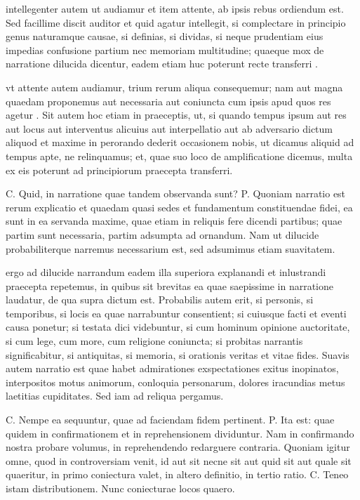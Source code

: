  intellegenter autem ut audiamur et item attente, ab ipsis rebus ordiendum est. Sed facillime discit auditor et quid agatur intellegit, si complectare in principio genus naturamque causae, si definias, si dividas, si neque prudentiam eius impedias confusione partium nec memoriam multitudine; quaeque mox de narratione dilucida dicentur, eadem etiam huc poterunt recte transferri .

 vt attente autem audiamur, trium rerum aliqua consequemur; nam aut magna quaedam proponemus aut necessaria aut coniuncta cum ipsis apud quos res agetur . Sit autem hoc etiam in praeceptis, ut, si quando tempus ipsum aut res aut locus aut interventus alicuius aut interpellatio aut ab adversario dictum aliquod et maxime in perorando dederit occasionem nobis, ut dicamus aliquid ad tempus apte, ne relinquamus; et, quae suo loco de amplificatione dicemus, multa ex eis poterunt ad principiorum praecepta transferri.

 C. Quid, in narratione quae tandem observanda sunt? P. Quoniam narratio est rerum explicatio et quaedam quasi sedes et fundamentum constituendae fidei, ea sunt in ea servanda maxime, quae etiam in reliquis fere dicendi partibus; quae partim sunt necessaria, partim adsumpta ad ornandum. Nam ut dilucide probabiliterque narremus necessarium est, sed adsumimus etiam suavitatem.

 ergo ad dilucide narrandum eadem illa superiora explanandi et inlustrandi praecepta repetemus, in quibus sit brevitas ea quae saepissime in narratione laudatur, de qua supra dictum est. Probabilis autem erit, si personis, si temporibus, si locis ea quae narrabuntur consentient; si cuiusque facti et eventi causa ponetur; si testata dici videbuntur, si cum hominum opinione auctoritate, si cum lege, cum more, cum religione coniuncta; si probitas narrantis significabitur, si antiquitas, si memoria, si orationis veritas et vitae fides. Suavis autem narratio est quae habet admirationes exspectationes exitus inopinatos, interpositos motus animorum, conloquia personarum, dolores iracundias metus laetitias cupiditates. Sed iam ad reliqua pergamus.

 C. Nempe ea sequuntur, quae ad faciendam fidem pertinent. P. Ita est: quae quidem in confirmationem et in reprehensionem dividuntur. Nam in confirmando nostra probare volumus, in reprehendendo redarguere contraria. Quoniam igitur omne, quod in controversiam venit, id aut sit necne sit aut quid sit aut quale sit quaeritur, in primo coniectura valet, in altero definitio, in tertio ratio. C. Teneo istam distributionem. Nunc coniecturae locos quaero.

